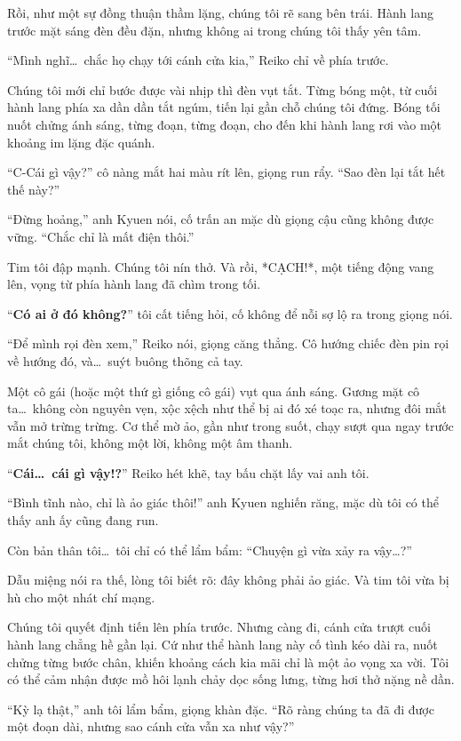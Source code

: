 \documentclass[../main.tex]{subfiles}
\begin{document}
Rồi, như một sự đồng thuận thầm lặng, chúng tôi rẽ sang bên trái. Hành lang trước mặt sáng đèn đều đặn, nhưng không ai trong chúng tôi thấy yên tâm.

``Mình nghĩ\dots\ chắc họ chạy tới cánh cửa kia,'' Reiko chỉ về phía trước.

Chúng tôi mới chỉ bước được vài nhịp thì đèn vụt tắt. Từng bóng một, từ cuối hành lang phía xa dần dần tắt ngúm, tiến lại gần chỗ chúng tôi đứng. Bóng tối nuốt chửng ánh sáng, từng đoạn, từng đoạn, cho đến khi hành lang rơi vào một khoảng im lặng đặc quánh.

``C-Cái gì vậy?'' cô nàng mắt hai màu rít lên, giọng run rẩy. ``Sao đèn lại tắt hết thế này?''

``Đừng hoảng,'' anh Kyuen nói, cố trấn an mặc dù giọng cậu cũng không được vững. ``Chắc chỉ là mất điện thôi.''

Tim tôi đập mạnh. Chúng tôi nín thở. Và rồi, *CẠCH!*, một tiếng động vang lên, vọng từ phía hành lang đã chìm trong tối.

``\textbf{Có ai ở đó không?}'' tôi cất tiếng hỏi, cố không để nỗi sợ lộ ra trong giọng nói.

``Để mình rọi đèn xem,'' Reiko nói, giọng căng thẳng. Cô hướng chiếc đèn pin rọi về hướng đó, và\dots\ suýt buông thõng cả tay.

Một cô gái (hoặc một thứ gì giống cô gái) vụt qua ánh sáng. Gương mặt cô ta\dots\ không còn nguyên vẹn, xộc xệch như thể bị ai đó xé toạc ra, nhưng đôi mắt vẫn mở trừng trừng. Cơ thể mờ ảo, gần như trong suốt, chạy sượt qua ngay trước mắt chúng tôi, không một lời, không một âm thanh.

``\textbf{Cái\dots\ cái gì vậy!?}'' Reiko hét khẽ, tay bấu chặt lấy vai anh tôi.

``Bình tĩnh nào, chỉ là ảo giác thôi!'' anh Kyuen nghiến răng, mặc dù tôi có thể thấy anh ấy cũng đang run.

Còn bản thân tôi\dots\ tôi chỉ có thể lẩm bẩm: ``Chuyện gì vừa xảy ra vậy\dots?''

Dẫu miệng nói ra thế, lòng tôi biết rõ: đây không phải ảo giác. Và tim tôi vừa bị hù cho một nhát chí mạng.

Chúng tôi quyết định tiến lên phía trước. Nhưng càng đi, cánh cửa trượt cuối hành lang chẳng hề gần lại. Cứ như thể hành lang này cố tình kéo dài ra, nuốt chửng từng bước chân, khiến khoảng cách kia mãi chỉ là một ảo vọng xa vời. Tôi có thể cảm nhận được mồ hôi lạnh chảy dọc sống lưng, từng hơi thở nặng nề dần.

``Kỳ lạ thật,'' anh tôi lẩm bẩm, giọng khàn đặc. ``Rõ ràng chúng ta đã đi được một đoạn dài, nhưng sao cánh cửa vẫn xa như vậy?''
\end{document}
